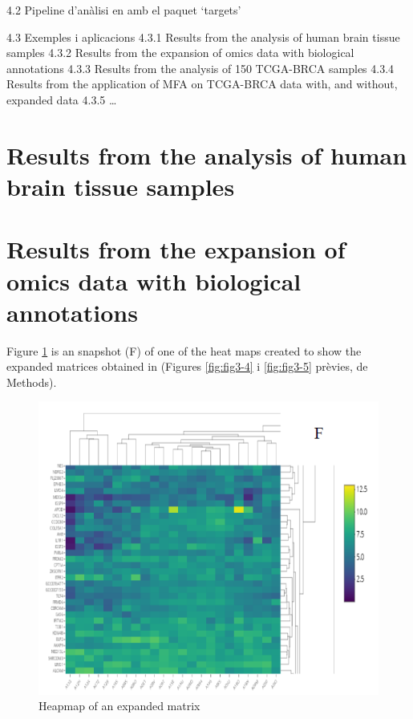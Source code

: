 \documentclass[a4paper, nobind]{templates/ociamthesis}
\begin{document}
4.2 Pipeline d'anàlisi en amb el paquet `targets'

4.3 Exemples i aplicacions
4.3.1 Results from the analysis of human brain tissue samples
4.3.2 Results from the expansion of omics data with biological annotations
4.3.3 Results from the analysis of 150 TCGA-BRCA samples
4.3.4 Results from the application of MFA on TCGA-BRCA data with, and without, expanded data
4.3.5 \ldots{}

\hypertarget{results-from-the-analysis-of-human-brain-tissue-samples}{%
\section{Results from the analysis of human brain tissue samples}\label{results-from-the-analysis-of-human-brain-tissue-samples}}

\hypertarget{results-from-the-expansion-of-omics-data-with-biological-annotations}{%
\section{Results from the expansion of omics data with biological annotations}\label{results-from-the-expansion-of-omics-data-with-biological-annotations}}

Figure \ref{fig:fig4-1} is an snapshot (F) of one of the heat maps created to show the expanded matrices obtained in (Figures \ref{fig:fig3-4} i \ref{fig:fig3-5} prèvies, de Methods).

\begin{figure}

{\centering \includegraphics[width=0.95\linewidth]{figures/chapter4/4-1_heatmap_expanded} 

}

\caption{Heapmap of an expanded matrix}\label{fig:fig4-1}
\end{figure}
\end{document}
